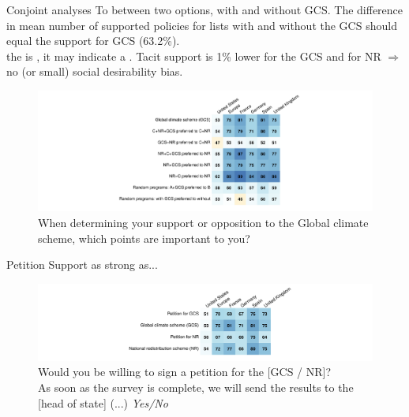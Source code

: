 \begin{framefont}{\small}
\begin{frame}{Conjoint analyses\label{}} %
    \bbvs \ip To  between two options, with and without GCS.
    \ip The difference in mean number of supported policies for lists with and without the GCS should equal the support for GCS (63.2\%). \\  the  is , it may indicate a .
    \ip Tacit support is 1\% lower for the GCS and for NR $\Rightarrow$ no (or small) social desirability bias. %
    \ee
    \begin{figure}
        \centering 
        \caption{When determining your support or opposition to the Global climate scheme, which points are important to you?}
        \vspace{-.2cm}
        \includegraphics[height=.9\textheight]{../figures/country_comparison/conjoint_positive.pdf} %
    \end{figure}
\end{frame}

\begin{frame}{Petition\label{}}
	\bbvs \ip Support as strong as... %
    \ee
    \begin{figure}
        \centering 
        \caption{Would you be willing to sign a petition for the [GCS / NR]? \\As soon as the survey is complete, we will send the results to the [head of state] (...) \textit{Yes/No} %
        }
        \vspace{-.2cm}
        \includegraphics[height=.5\textheight]{../figures/country_comparison/petition_positive.pdf} 
    \end{figure}
\end{frame}


\end{framefont}
